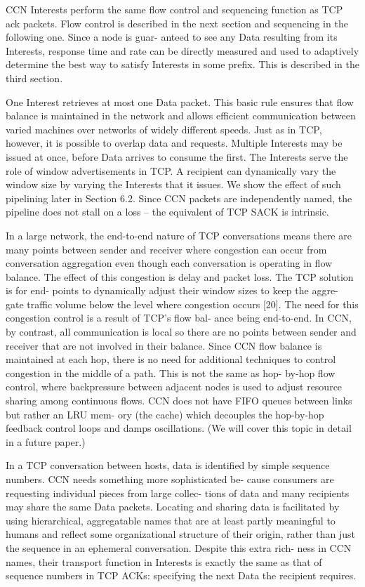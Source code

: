 \par
CCN Interests perform the same flow control and sequencing function as TCP ack packets. Flow control is described in the next section and sequencing in the following one. Since a node is guar- anteed to see any Data resulting from its Interests, response time and rate can be directly measured and used to adaptively determine the best way to satisfy Interests in some prefix. This is described in the third section.
\par
One Interest retrieves at most one Data packet. This basic rule ensures that flow balance is maintained in the network and allows efficient communication between varied machines over networks of widely different speeds. Just as in TCP, however, it is possible to overlap data and requests. Multiple Interests may be issued at once, before Data arrives to consume the first. The Interests serve the role of window advertisements in TCP. A recipient can dynamically vary the window size by varying the Interests that it issues. We show the effect of such pipelining later in Section 6.2. Since CCN packets are independently named, the pipeline does not stall on a loss – the equivalent of TCP SACK is intrinsic.
\par
In a large network, the end-to-end nature of TCP conversations means there are many points between sender and receiver where congestion can occur from conversation aggregation even though each conversation is operating in flow balance. The effect of this congestion is delay and packet loss. The TCP solution is for end- points to dynamically adjust their window sizes to keep the aggre- gate traffic volume below the level where congestion occurs [20]. The need for this congestion control is a result of TCP’s flow bal- ance being end-to-end. In CCN, by contrast, all communication is local so there are no points between sender and receiver that are not involved in their balance. Since CCN flow balance is maintained at each hop, there is no need for additional techniques to control congestion in the middle of a path. This is not the same as hop- by-hop flow control, where backpressure between adjacent nodes is used to adjust resource sharing among continuous flows. CCN does not have FIFO queues between links but rather an LRU mem- ory (the cache) which decouples the hop-by-hop feedback control loops and damps oscillations. (We will cover this topic in detail in a future paper.)
\par
In a TCP conversation between hosts, data is identified by simple sequence numbers. CCN needs something more sophisticated be- cause consumers are requesting individual pieces from large collec- tions of data and many recipients may share the same Data packets. Locating and sharing data is facilitated by using hierarchical, aggregatable names that are at least partly meaningful to humans and reflect some organizational structure of their origin, rather than just the sequence in an ephemeral conversation. Despite this extra rich- ness in CCN names, their transport function in Interests is exactly the same as that of sequence numbers in TCP ACKs: specifying the next Data the recipient requires.
